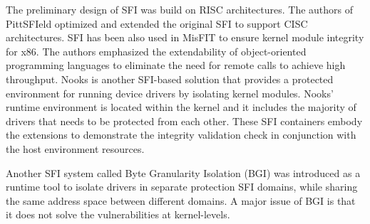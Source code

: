 The preliminary design of SFI was build on RISC
architectures. The authors of PittSFIeld \cite{PittSFIeld} optimized and
extended the original SFI to support CISC architectures.
%
SFI has been also used in MisFIT \cite{MISFit} to ensure kernel
module integrity for x86. The authors emphasized the
extendability of object-oriented programming languages to eliminate
the need for remote calls to achieve high throughput.
%
Nooks \cite{Nooks:03} is another SFI-based solution that provides
a protected environment for running device drivers by isolating kernel
modules. Nooks' runtime environment is located within the
kernel and it includes the majority of drivers that needs to be protected
from each other.
These SFI containers embody the extensions to demonstrate the integrity
validation check in conjunction with the host environment resources.

Another SFI system called Byte
Granularity Isolation (BGI) \cite{Castro-BGI} was introduced as a runtime tool to isolate drivers in
separate protection SFI domains, while sharing the same address space
between different domains.
A major issue of BGI is that it
does not solve the vulnerabilities at kernel-levels.

